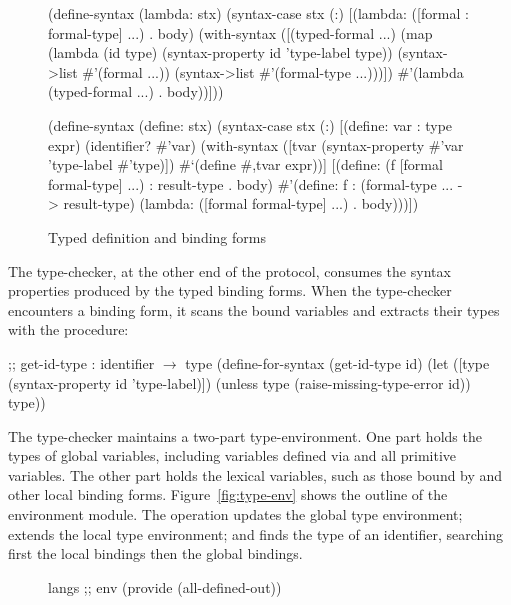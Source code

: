 \begin{schemeregion}
\begin{figure}
\begin{schemedisplay}
(define-syntax (lambda: stx)
  (syntax-case stx (:)
    [(lambda: ([formal : formal-type] ...) . body)
     (with-syntax ([(typed-formal ...)
                    (map
                     (lambda (id type)
                       (syntax-property id 'type-label type))
                     (syntax->list #'(formal ...))
                     (syntax->list #'(formal-type ...)))])
       #'(lambda (typed-formal ...) . body))]))

(define-syntax (define: stx)
  (syntax-case stx (:)
    [(define: var : type expr)
     (identifier? #'var)
     (with-syntax ([tvar (syntax-property #'var 'type-label #'type)])
       #`(define #,tvar expr))]
    [(define: (f [formal formal-type] ...) : result-type . body)
     #'(define: f : (formal-type ... -> result-type)
         (lambda: ([formal formal-type] ...) . body)))])
\end{schemedisplay}
\caption{Typed definition and binding forms}
\label{fig:typed-binding-forms}
\end{figure}

The type-checker, at the other end of the protocol, consumes the
syntax properties produced by the typed binding forms.  When the
type-checker encounters a binding form, it scans the bound variables
and extracts their types with the  procedure:
\begin{schemedisplay}
;; get-id-type : identifier $\rightarrow$ type
(define-for-syntax (get-id-type id)
  (let ([type (syntax-property id 'type-label)])
    (unless type (raise-missing-type-error id))
    type))
\end{schemedisplay}

The type-checker maintains a two-part type-environment. One part holds
the types of global variables, including variables defined via
 and all primitive variables. The other part holds the
lexical variables, such as those bound by  and other
local binding forms. Figure~\ref{fig:type-env} shows the outline of the
environment module. The  operation updates the
global type environment;  extends the local type
environment; and  finds the type of an identifier,
searching first the local bindings then the global bindings.


\begin{figure}
\begin{schemedisplay}
langs ;; env
(provide (all-defined-out))


\end{schemedisplay}
\end{figure}
\end{schemeregion}

